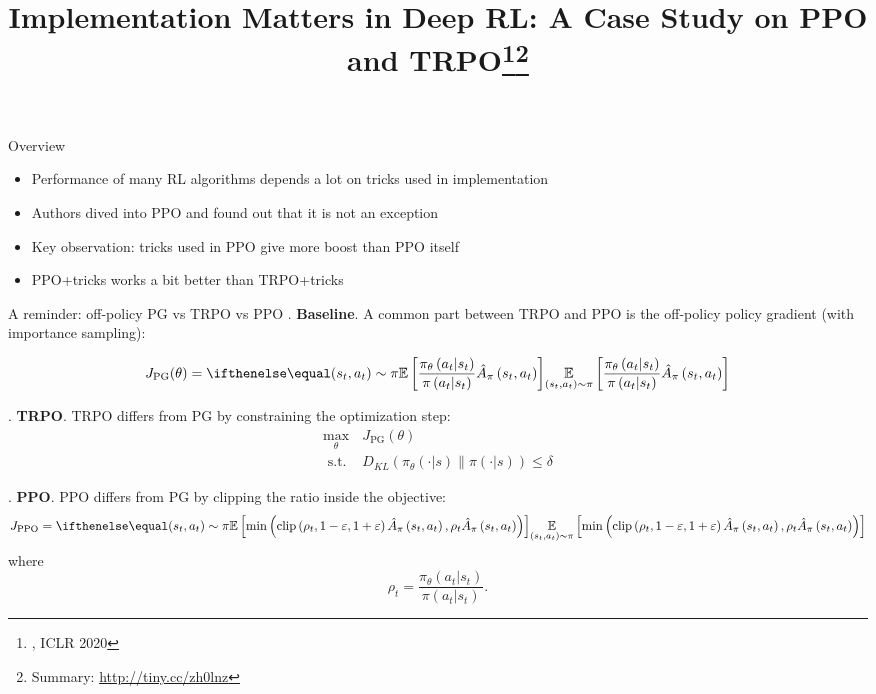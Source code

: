 \documentclass[10pt]{beamer}
\title{Implementation Matters in Deep RL: A Case Study on PPO and TRPO\footnote{\citepaper{ImplementationMattersInRL}, ICLR 2020}\footnote{Summary: \href{http://tiny.cc/zh0lnz}{http://tiny.cc/zh0lnz}}}
\date{}
\begin{document}
\begin{frame}
    \titlepage
\end{frame}

\begin{frame}{Overview}
    \begin{itemize}
        \item\pause Performance of many RL algorithms depends a lot on tricks used in implementation
        \item\pause Authors dived into PPO and found out that it is not an exception
        \item\pause Key observation: tricks used in PPO give more boost than PPO itself
        \item\pause PPO+tricks works a bit better than TRPO+tricks
    \end{itemize}
\end{frame}

\begin{frame}{A reminder: off-policy PG vs TRPO vs PPO}
. \textbf{Baseline}. A common part between TRPO and PPO is the off-policy policy gradient (with importance sampling):

\begin{equation}
J_\text{PG}(\theta) = \expect[\left(s_{t}, a_{t}\right) \sim \pi]{\frac{\pi_{\theta}\left(a_{t} | s_{t}\right)}{\pi\left(a_{t} | s_{t}\right)} \hat{A}_{\pi}\left(s_{t}, a_{t}\right)}
\end{equation}

. \textbf{TRPO}. TRPO differs from PG by constraining the optimization step:
\begin{equation}
\begin{array}{cl}
\max _{\theta} & J_\text{PG}(\theta) \\
\text { s.t. } & D_{K L}\left(\pi_{\theta}(\cdot | s) \| \pi(\cdot | s)\right) \leq \delta
\end{array}
\end{equation}

. \textbf{PPO}. PPO differs from PG by clipping the ratio inside the objective:
\begin{equation}
J_\text{PPO} = \expect[\left(s_{t}, a_{t}\right) \sim \pi]{\min \left(\operatorname{clip}\left(\rho_{t}, 1-\varepsilon, 1+\varepsilon\right) \hat{A}_{\pi}\left(s_{t}, a_{t}\right), \rho_{t} \hat{A}_{\pi}\left(s_{t}, a_{t}\right)\right)}
\end{equation}
where
\begin{equation}
\rho_{t}=\frac{\pi_{\theta}\left(a_{t} | s_{t}\right)}{\pi\left(a_{t} | s_{t}\right)}.
\end{equation}

\end{frame}
\end{document}
